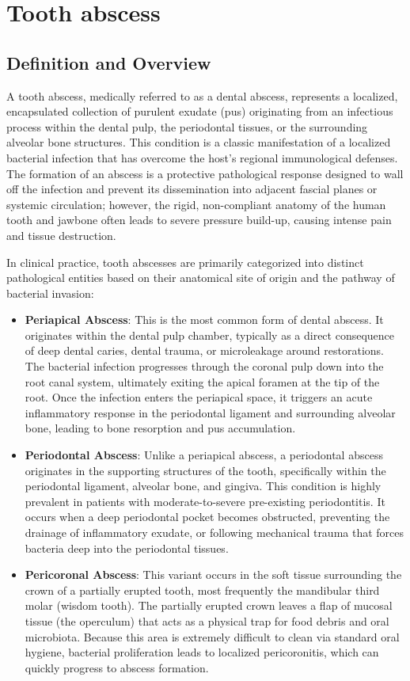 \chapter{Tooth abscess}

\section*{Definition and Overview}
A tooth abscess, medically referred to as a dental abscess, represents a localized, encapsulated collection of purulent exudate (pus) originating from an infectious process within the dental pulp, the periodontal tissues, or the surrounding alveolar bone structures. This condition is a classic manifestation of a localized bacterial infection that has overcome the host's regional immunological defenses. The formation of an abscess is a protective pathological response designed to wall off the infection and prevent its dissemination into adjacent fascial planes or systemic circulation; however, the rigid, non-compliant anatomy of the human tooth and jawbone often leads to severe pressure build-up, causing intense pain and tissue destruction.

In clinical practice, tooth abscesses are primarily categorized into distinct pathological entities based on their anatomical site of origin and the pathway of bacterial invasion:
\begin{itemize}
  \item \textbf{Periapical Abscess}: This is the most common form of dental abscess. It originates within the dental pulp chamber, typically as a direct consequence of deep dental caries, dental trauma, or microleakage around restorations. The bacterial infection progresses through the coronal pulp down into the root canal system, ultimately exiting the apical foramen at the tip of the root. Once the infection enters the periapical space, it triggers an acute inflammatory response in the periodontal ligament and surrounding alveolar bone, leading to bone resorption and pus accumulation.
  \item \textbf{Periodontal Abscess}: Unlike a periapical abscess, a periodontal abscess originates in the supporting structures of the tooth, specifically within the periodontal ligament, alveolar bone, and gingiva. This condition is highly prevalent in patients with moderate-to-severe pre-existing periodontitis. It occurs when a deep periodontal pocket becomes obstructed, preventing the drainage of inflammatory exudate, or following mechanical trauma that forces bacteria deep into the periodontal tissues.
  \item \textbf{Pericoronal Abscess}: This variant occurs in the soft tissue surrounding the crown of a partially erupted tooth, most frequently the mandibular third molar (wisdom tooth). The partially erupted crown leaves a flap of mucosal tissue (the operculum) that acts as a physical trap for food debris and oral microbiota. Because this area is extremely difficult to clean via standard oral hygiene, bacterial proliferation leads to localized pericoronitis, which can quickly progress to abscess formation.
\end{itemize}

